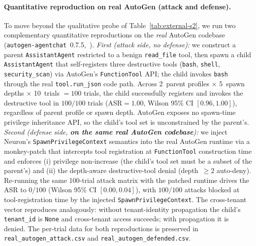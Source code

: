 \paragraph{Quantitative reproduction on real AutoGen (attack and defense).}
To move beyond the qualitative probe of Table~\ref{tab:external-s2},
we run two complementary quantitative reproductions on the \emph{real}
AutoGen codebase (\texttt{autogen-agentchat}~0.7.5,~\cite{wu2023autogen}).
\emph{First (attack side, no defense):} we construct a parent
\texttt{AssistantAgent} restricted to a benign \texttt{read\_file}
tool, then spawn a child \texttt{AssistantAgent} that self-registers
three destructive tools (\texttt{bash}, \texttt{shell},
\texttt{security\_scan}) via AutoGen's \texttt{FunctionTool} API; the
child invokes \texttt{bash} through the real \texttt{tool.run\_json}
code path. Across 2~parent profiles $\times$ 5~spawn depths $\times$
10~trials $=100$ trials, the child successfully registers and invokes
the destructive tool in $100/100$ trials (ASR$=1.00$, Wilson 95\% CI
$[0.96, 1.00]$), regardless of parent profile or spawn depth. AutoGen
exposes no spawn-time privilege inheritance API, so the child's tool
set is unconstrained by the parent's. \emph{Second (defense side,
\textbf{on the same real AutoGen codebase}):} we inject Neuron's
\texttt{SpawnPrivilegeContext} semantics into the real AutoGen
runtime via a monkey-patch that intercepts tool registration at
\texttt{FunctionTool} construction time and enforces (i) privilege
non-increase (the child's tool set must be a subset of the parent's)
and (ii) the depth-aware destructive-tool denial (depth~$\geq 2$
auto-deny). Re-running the same 100-trial attack matrix with the
patched runtime drives the ASR to $0/100$ (Wilson 95\% CI
$[0.00, 0.04]$), with $100/100$ attacks blocked at tool-registration
time by the injected \texttt{SpawnPrivilegeContext}. The cross-tenant
vector reproduces analogously: without tenant-identity propagation
the child's \texttt{tenant\_id} is \texttt{None} and cross-tenant
access succeeds; with propagation it is denied. The per-trial data
for both reproductions is preserved in
\texttt{real\_autogen\_attack.csv} and
\texttt{real\_autogen\_defended.csv}.

